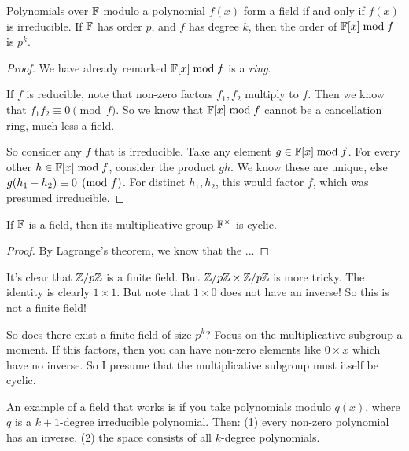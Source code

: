 \begin{theorem}
  Polynomials over $\mathbb{F}$ modulo a polynomial $f(x)$ form a field if and
  only if $f(x)$ is irreducible. If $\mathbb{F}$ has order $p$, and $f$ has
  degree $k$, then the order of $\mathbb{F}[x] \bmod f$ is $p^k$.
\end{theorem}

\begin{proof}
  We have already remarked $\mathbb{F}[x] \bmod f$ is a \emph{ring}.

  If $f$ is reducible, note that non-zero factors $f_1, f_2$ multiply to
  $f$. Then we know that $f_1 f_2 \equiv 0 \pmod{f}$. So we know that
  $\mathbb{F}[x] \bmod f$ cannot be a cancellation ring, much less a field.

  So consider any $f$ that is irreducible. Take any element $g \in \mathbb{F}[x]
  \bmod f$. For every other $h \in \mathbb{F}[x] \bmod f$, consider the product
  $g h$. We know these are unique, else $g \mathopen{}\left( {h_1 - h_2} \right)\mathclose{} \equiv 0
  \pmod{f}$. For distinct $h_1, h_2$, this would factor $f$, which was
  presumed irreducible.
\end{proof}

\begin{theorem}
  If $\mathbb{F}$ is a field, then its multiplicative group $\mathbb{F}^\times$ is
  cyclic.
\end{theorem}

\begin{proof}
  By Lagrange's theorem, we know that the ...
\end{proof}

\begin{remark}
  It's clear that $\mathbb{Z} / p\mathbb{Z}$ is a finite field. But $\mathbb{Z} / p\mathbb{Z} \times \mathbb{Z} / p\mathbb{Z}$
  is more tricky. The identity is clearly $1 \times 1$. But note that $1
  \times 0$ does not have an inverse! So this is not a finite field!

  So does there exist a finite field of size $p^k$? Focus on the
  multiplicative subgroup a moment. If this factors, then you can have
  non-zero elements like $0 \times x$ which have no inverse. So I
  presume that the multiplicative subgroup must itself be cyclic.

  An example of a field that works is if you take polynomials modulo
  $q(x)$, where $q$ is a $k+1$-degree irreducible polynomial. Then: (1)
  every non-zero polynomial has an inverse, (2) the space consists of
  all $k$-degree polynomials.
\end{remark}
